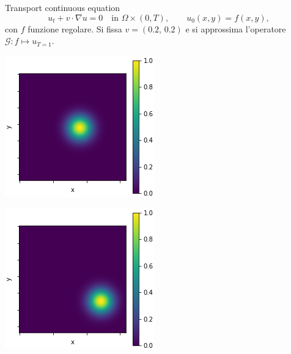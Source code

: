 \documentclass[aspectratio=169]{beamer}
\begin{document}
\begin{frame}[t]{Transport continuous equation}
    \[
        u_{t} + v \cdot \nabla u = 0 \quad \text{in } \Omega \times (0, T), \quad\quad u_{0}(x, y) = f(x, y),
    \]
    con $f$ funzione regolare. Si fissa $v = (0.2, \, 0.2)$ e si approssima l'operatore $\mathcal{G}: f\mapsto u_{T=1}$.
    \begin{center}
        \begin{minipage}{0.24\textwidth}
            \includegraphics[width=\textwidth]{operators/contTrans/input.png}
        \end{minipage}
        \hfill
        \begin{minipage}{0.24\textwidth}
            \includegraphics[width=\textwidth]{operators/contTrans/output.png}

\end{minipage}
\end{center}
\end{frame}
\end{document}
